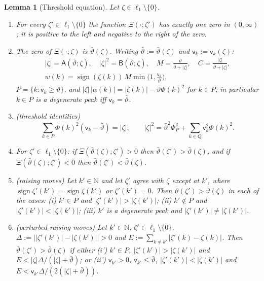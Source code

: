 \documentclass[10pt]{amsart}
\newtheorem{lemma}[theorem]{Lemma}
\theoremstyle{definition}
\theoremstyle{remark}
\newcommand{\sgn}{\operatorname{sign}}
\newcommand{\N}{\mathbb N}
\begin{document}
\begin{lemma}[Threshold equation]\label{lem:II-T}
Let $\zeta\in\ell_1\setminus\{0\}$.
\begin{enumerate}
\item[(a)] For every $\zeta'\in\ell_1\setminus\{0\}$ the function
$\Xi(\cdot;\zeta')$ has exactly one zero in $(0,\infty)$; it is positive to
the left and negative to the right of the zero.
\item[(b)] The zero of $\Xi(\cdot;\zeta)$ is $\bar\vartheta(\zeta)$.  Writing
$\bar\vartheta:=\bar\vartheta(\zeta)$ and $\mathsf v_k:=\mathsf v_k(\zeta)$:
\[
 \begin{gathered}
 |\zeta|=\mathsf A(\bar\vartheta;\zeta),\quad |\zeta|^2=\mathsf B(\bar\vartheta;
 \zeta),\quad M=\frac{\bar\vartheta}{\bar\vartheta+|\zeta|},\quad
 C=\frac{|\zeta|}{\bar\vartheta+|\zeta|},\\
 w(k)=\sgn(\zeta(k))\,M\min\Big(1,\frac{\mathsf v_k}{\bar\vartheta}\Big),
 \end{gathered}
\]
$P=\{k:\mathsf v_k\ge\bar\vartheta\}$, and $|\zeta|\,|\alpha(k)|=|\zeta(k)|-
\bar\vartheta\Phi(k)^2$ for $k\in P$; in particular $k\in P$ is a
degenerate peak iff $\mathsf v_k=\bar\vartheta$.
\item[(c)] \textup{(threshold identities)}
\[
 \sum_{k\in P}\Phi(k)^2(\mathsf v_k-\bar\vartheta)=|\zeta|,\qquad
 |\zeta|^2=\bar\vartheta^2\Phi_P^2+\sum_{k\in Q}\mathsf v_k^2\Phi(k)^2 .
\]
\item[(d)] For $\zeta'\in\ell_1\setminus\{0\}$: if $\Xi(\bar\vartheta(\zeta);
\zeta')>0$ then $\bar\vartheta(\zeta')>\bar\vartheta(\zeta)$, and if
$\Xi(\bar\vartheta(\zeta);\zeta')<0$ then $\bar\vartheta(\zeta')<\bar\vartheta
(\zeta)$.
\item[(e)] \textup{(raising moves)} Let $k'\in\N$ and let $\zeta'$ agree
with $\zeta$ except at $k'$, where $\sgn\zeta'(k')=\sgn\zeta(k')$ or
$\zeta'(k')=0$.  Then $\bar\vartheta(\zeta')>\bar\vartheta(\zeta)$ in each of the
cases: \textup{(i)} $k'\in P$ and $|\zeta'(k')|>|\zeta(k')|$;
\textup{(ii)} $k'\notin P$ and $|\zeta'(k')|<|\zeta(k')|$;
\textup{(iii)} $k'$ is a degenerate peak and $|\zeta'(k')|\ne|\zeta(k')|$.
\item[(f)] \textup{(perturbed raising moves)} Let $k'\in\N$,
$\zeta'\in\ell_1\setminus\{0\}$, $\Delta:=\big||\zeta'(k')|-|\zeta(k')|\big|>0$
and $E:=\sum_{k\ne k'}|\zeta'(k)-\zeta(k)|$.  Then $\bar\vartheta(\zeta')>
\bar\vartheta(\zeta)$ if either \textup{(i')} $k'\in P$,
$|\zeta'(k')|>|\zeta(k')|$ and $E<|\zeta|\Delta/(|\zeta|+\bar\vartheta)$; or
\textup{(ii')} $\mathsf v_{k'}>0$, $\mathsf v_{k'}\le\bar\vartheta$,
$|\zeta'(k')|<|\zeta(k')|$ and $E<\mathsf v_{k'}\Delta/(2(|\zeta|+
\bar\vartheta))$.
\end{enumerate}
\end{lemma}
\end{document}
